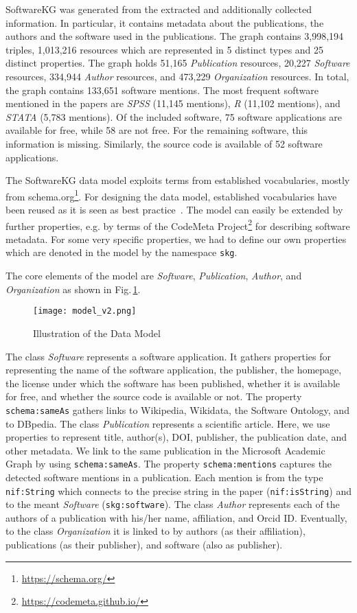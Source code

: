 \documentclass[runningheads]{llncs}
\newcommand{\figref}[1]{Fig.\,\ref{#1}}
\begin{document}
SoftwareKG was generated from the extracted and additionally collected information.
In particular, it contains metadata about the publications, the authors and the software used in the publications.
The graph contains 3,998,194 triples, 1,013,216 resources which are represented in 5 distinct types and 25 distinct properties.
The graph holds 51,165 \textit{Publication} resources, 20,227 \textit{Software} resources, 334,944 \textit{Author} resources, and 473,229 \textit{Organization} resources.
In total, the graph contains 133,651 software mentions.
The most frequent software mentioned in the papers are \textit{SPSS} (11,145 mentions), \textit{R} (11,102 mentions), and \textit{STATA} (5,783 mentions).
Of the included software, 75 software applications are available for free, while 58 are not free.
For the remaining software, this information is missing.
Similarly, the source code is available of 52 software applications.

The SoftwareKG data model exploits terms from established vocabularies, mostly from schema.org\footnote{\url{https://schema.org/}}. 
For designing the data model, established vocabularies have been reused as it is seen as best practice~\cite{heath2011linked}.
The model can easily be extended by further properties, e.g. by terms of the CodeMeta Project\footnote{\url{https://codemeta.github.io/}} for describing software metadata.
For some very specific properties, we had to define our own properties which are denoted in the model by the namespace \texttt{skg}.

The core elements of the model are \textit{Software}, \textit{Publication},  \textit{Author}, and \textit{Organization} as shown in \figref{fig:data_model}. 
\begin{figure}[t]
    \centering
    \texttt{[image: model\_v2.png]}
    \caption{Illustration of the Data Model}
    \label{fig:data_model}
\end{figure}
The class \textit{Software} represents a software application. 
It gathers properties for representing the name of the software application, the publisher, the homepage, the license under which the software has been published, whether it is available for free, and whether the source code is available or not.
The property \texttt{schema:sameAs} gathers links to Wikipedia, Wikidata, the Software Ontology, and to DBpedia.
The class \textit{Publication} represents a scientific article. 
Here, we use properties to represent title, author(s), DOI, publisher, the publication date, and other metadata.
We link to the same publication in the Microsoft Academic Graph by using \texttt{schema:sameAs}.
The property \texttt{schema:mentions} captures the detected software mentions in a publication.
Each mention is from the type \texttt{nif:String} which connects to the precise string in the paper (\texttt{nif:isString}) and to the meant \textit{Software} (\texttt{skg:software}).
The class \textit{Author} represents each of the authors of a publication with his/her name, affiliation, and Orcid ID.
Eventually, to the class \textit{Organization} it is linked to by authors (as their affiliation), publications (as their publisher), and software (also as publisher).
\end{document}
